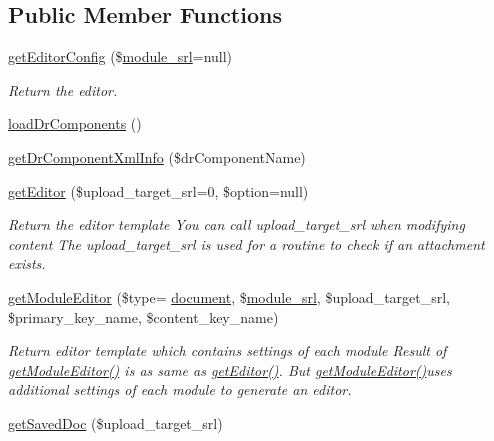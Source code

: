 \subsection*{Public Member Functions}
\begin{DoxyCompactItemize}
\item 
\hyperlink{classeditorModel_a66f732bbdd500d31fb39fd03eb8d46b5}{get\+Editor\+Config} (\$\hyperlink{ko_8install_8php_a370bb6450fab1da3e0ed9f484a38b761}{module\+\_\+srl}=null)
\begin{DoxyCompactList}\small\item\em Return the editor. \end{DoxyCompactList}\item 
\hyperlink{classeditorModel_a1ad866d4c1ab454b9d0b72c8d3cc29bd}{load\+Dr\+Components} ()
\item 
\hyperlink{classeditorModel_a580e31ed0fff869a97d5fe598975e960}{get\+Dr\+Component\+Xml\+Info} (\$dr\+Component\+Name)
\item 
\hyperlink{classeditorModel_a77477c0a6d333b3230f77904d96d93c5}{get\+Editor} (\$upload\+\_\+target\+\_\+srl=0, \$option=null)
\begin{DoxyCompactList}\small\item\em Return the editor template You can call upload\+\_\+target\+\_\+srl when modifying content The upload\+\_\+target\+\_\+srl is used for a routine to check if an attachment exists. \end{DoxyCompactList}\item 
\hyperlink{classeditorModel_a7870d2a76cbc33a9dbaea3f865edd313}{get\+Module\+Editor} (\$type= \textquotesingle{}\hyperlink{classdocument}{document}\textquotesingle{}, \$\hyperlink{ko_8install_8php_a370bb6450fab1da3e0ed9f484a38b761}{module\+\_\+srl}, \$upload\+\_\+target\+\_\+srl, \$primary\+\_\+key\+\_\+name, \$content\+\_\+key\+\_\+name)
\begin{DoxyCompactList}\small\item\em Return editor template which contains settings of each module Result of \hyperlink{classeditorModel_a7870d2a76cbc33a9dbaea3f865edd313}{get\+Module\+Editor()} is as same as \hyperlink{classeditorModel_a77477c0a6d333b3230f77904d96d93c5}{get\+Editor()}. But \hyperlink{classeditorModel_a7870d2a76cbc33a9dbaea3f865edd313}{get\+Module\+Editor()}uses additional settings of each module to generate an editor. \end{DoxyCompactList}\item 
\hyperlink{classeditorModel_af9c4c2f7ba2d377b087cac08412b0baa}{get\+Saved\+Doc} (\$upload\+\_\+target\+\_\+srl)

\end{DoxyCompactItemize}
